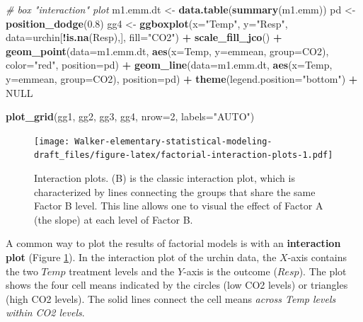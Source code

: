 \documentclass[]{book}
\newenvironment{Shaded}{\begin{snugshade}}{\end{snugshade}}
\newcommand{\KeywordTok}[1]{\textcolor[rgb]{0.13,0.29,0.53}{\textbf{#1}}}
\newcommand{\DataTypeTok}[1]{\textcolor[rgb]{0.13,0.29,0.53}{#1}}
\newcommand{\DecValTok}[1]{\textcolor[rgb]{0.00,0.00,0.81}{#1}}
\newcommand{\FloatTok}[1]{\textcolor[rgb]{0.00,0.00,0.81}{#1}}
\newcommand{\StringTok}[1]{\textcolor[rgb]{0.31,0.60,0.02}{#1}}
\newcommand{\CommentTok}[1]{\textcolor[rgb]{0.56,0.35,0.01}{\textit{#1}}}
\newcommand{\OtherTok}[1]{\textcolor[rgb]{0.56,0.35,0.01}{#1}}
\newcommand{\OperatorTok}[1]{\textcolor[rgb]{0.81,0.36,0.00}{\textbf{#1}}}
\newcommand{\NormalTok}[1]{#1}
\begin{document}
\begin{Shaded}
\begin{Highlighting}[]
\CommentTok{# box "interaction" plot}
\NormalTok{m1.emm.dt <-}\StringTok{ }\KeywordTok{data.table}\NormalTok{(}\KeywordTok{summary}\NormalTok{(m1.emm))}
\NormalTok{pd <-}\StringTok{ }\KeywordTok{position_dodge}\NormalTok{(}\FloatTok{0.8}\NormalTok{)}
\NormalTok{gg4 <-}\StringTok{ }\KeywordTok{ggboxplot}\NormalTok{(}\DataTypeTok{x=}\StringTok{"Temp"}\NormalTok{,}
          \DataTypeTok{y=}\StringTok{"Resp"}\NormalTok{,}
          \DataTypeTok{data=}\NormalTok{urchin[}\OperatorTok{!}\KeywordTok{is.na}\NormalTok{(Resp),],}
          \DataTypeTok{fill=}\StringTok{"CO2"}\NormalTok{) }\OperatorTok{+}
\StringTok{  }\KeywordTok{scale_fill_jco}\NormalTok{() }\OperatorTok{+}
\StringTok{  }\KeywordTok{geom_point}\NormalTok{(}\DataTypeTok{data=}\NormalTok{m1.emm.dt, }
             \KeywordTok{aes}\NormalTok{(}\DataTypeTok{x=}\NormalTok{Temp, }\DataTypeTok{y=}\NormalTok{emmean, }\DataTypeTok{group=}\NormalTok{CO2),}
             \DataTypeTok{color=}\StringTok{"red"}\NormalTok{,}
             \DataTypeTok{position=}\NormalTok{pd) }\OperatorTok{+}
\StringTok{  }\KeywordTok{geom_line}\NormalTok{(}\DataTypeTok{data=}\NormalTok{m1.emm.dt, }
            \KeywordTok{aes}\NormalTok{(}\DataTypeTok{x=}\NormalTok{Temp, }\DataTypeTok{y=}\NormalTok{emmean, }\DataTypeTok{group=}\NormalTok{CO2),}
            \DataTypeTok{position=}\NormalTok{pd) }\OperatorTok{+}
\StringTok{  }\KeywordTok{theme}\NormalTok{(}\DataTypeTok{legend.position=}\StringTok{"bottom"}\NormalTok{) }\OperatorTok{+}
\StringTok{  }\OtherTok{NULL}

\KeywordTok{plot_grid}\NormalTok{(gg1, gg2, gg3, gg4, }\DataTypeTok{nrow=}\DecValTok{2}\NormalTok{, }\DataTypeTok{labels=}\StringTok{"AUTO"}\NormalTok{)}
\end{Highlighting}
\end{Shaded}

\begin{figure}
\centering
\texttt{[image: Walker-elementary-statistical-modeling-draft\_files/figure-latex/factorial-interaction-plots-1.pdf]}
\caption{\label{fig:factorial-interaction-plots}Interaction plots. (B) is
the classic interaction plot, which is characterized by lines connecting
the groups that share the same Factor B level. This line allows one to
visual the effect of Factor A (the slope) at each level of Factor B.}
\end{figure}

A common way to plot the results of factorial models is with an
\textbf{interaction plot} (Figure
\ref{fig:factorial-interaction-plots}). In the interaction plot of the
urchin data, the \(X\)-axis contains the two \(Temp\) treatment levels
and the \(Y\)-axis is the outcome (\(Resp\)). The plot shows the four
cell means indicated by the circles (low CO2 levels) or triangles (high
CO2 levels). The solid lines connect the cell means \emph{across Temp
levels within CO2 levels}.
\end{document}
